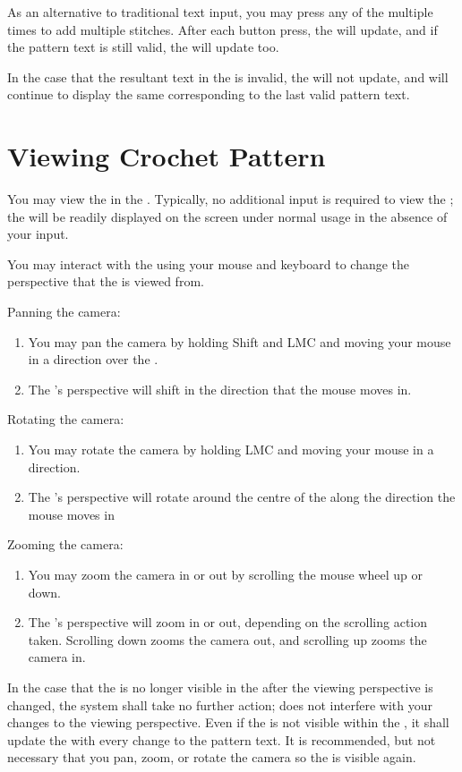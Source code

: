 \documentclass[main.tex]{subfiles}
\begin{document}
As an alternative to traditional text input, you may press any of the \ASB{} multiple times to add multiple stitches. After each button press, the \PTI{} will update, and if the pattern text is still valid, the \CRW{} will update too.

In the case that the resultant text in the \PTI{} is invalid, the \CRW{} will not update, and will continue to display the same \RM{} corresponding to the last valid pattern text.

\section{Viewing Crochet Pattern}

You may view the \RM{} in the \CRW. Typically, no additional input is required to view the \RM; the \RM{} will be readily displayed on the screen under normal usage in the absence of your input.

You may interact with the \CRW{} using your mouse and keyboard to change the perspective that the \RM{} is viewed from.

Panning the camera:
\begin{enumerate}
\item You may pan the camera by holding Shift and LMC and moving your mouse in a direction over the \CRW.
\item The \CRW's perspective will shift in the direction that the mouse moves in.
\end{enumerate}

Rotating the camera:
\begin{enumerate}
\item You may rotate the camera by holding LMC and moving your mouse in a direction.
\item The \CRW's perspective will rotate around the centre of the \RM{} along the direction the mouse moves in
\end{enumerate}

Zooming the camera:
\begin{enumerate}
\item You may zoom the camera in or out by scrolling the mouse wheel up or down. 
\item The \CRW's perspective will zoom in or out, depending on the scrolling action taken. Scrolling down zooms the camera out, and scrolling up zooms the camera in.
\end{enumerate}

In the case that the \RM{} is no longer visible in the \CRW{} after the viewing perspective is changed, the \CC{} system shall take no further action; \CC{} does not interfere with your changes to the viewing perspective. Even if the \RM{} is not visible within the \CRW, it shall update the \RM{} with every change to the pattern text. It is recommended, but not necessary that you pan, zoom, or rotate the camera so the \RM{} is visible again.
\end{document}
